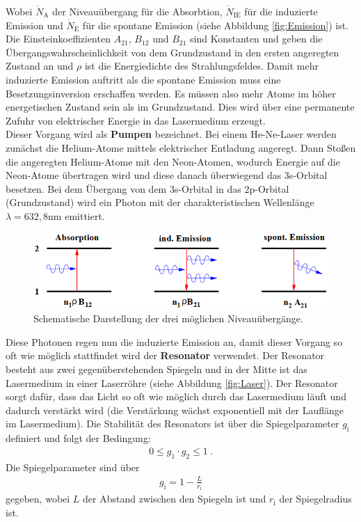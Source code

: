 Wobei $\dot{N}_\text{A}$ der Niveauübergang für die Absorbtion, $\dot{N}_\text{IE}$ für die induzierte Emission und $\dot{N}_\text{E}$ für die spontane Emission (siehe Abbildung \eqref{fig:Emission}) ist. Die Einsteinkoeffizienten $A_{21}$, $B_{12}$ und $B_{21}$ sind Konstanten und geben die Übergangswahrscheinlichkeit von dem Grundzustand in den ersten angeregten Zustand an und $\rho$ ist die Energiedichte des Strahlungsfeldes. Damit mehr induzierte Emission auftritt als die spontane Emission muss eine Besetzungsinversion erschaffen werden. Es müssen also mehr Atome im höher energetischen Zustand sein als im Grundzustand. Dies wird über eine permanente Zufuhr von elektrischer Energie in das Lasermedium erzeugt. \\
Dieser Vorgang wird als \textbf{Pumpen} bezeichnet. Bei einem He-Ne-Laser werden zunächst die Helium-Atome mittels elektrischer Entladung angeregt. Dann Stoßen die angeregten Helium-Atome mit den Neon-Atomen, wodurch Energie auf die Neon-Atome übertragen wird und diese danach überwiegend das 3s-Orbital besetzen. Bei dem Übergang von dem 3s-Orbital in das 2p-Orbital (Grundzustand) wird ein Photon mit der charakteristischen Wellenlänge $\lambda = 632,8$nm emittiert.

\begin{figure}[H]
	\includegraphics[width=\linewidth]{Bilder/Emission.PNG}
	\caption{Schematische Darstellung der drei möglichen Niveauübergänge. \cite{V61}}
	\label{fig:Emission}
\end{figure}

Diese Photonen regen nun die induzierte Emission an, damit dieser Vorgang so oft wie möglich stattfindet wird der \textbf{Resonator} verwendet. Der Resonator besteht aus zwei gegenüberstehenden Spiegeln und in der Mitte ist das Lasermedium in einer Laserröhre (siehe Abbildung \eqref{fig:Laser}). Der Resonator sorgt dafür, dass das Licht so oft wie möglich durch das Lasermedium läuft und dadurch verstärkt wird (die Verstärkung wächst exponentiell mit der Lauflänge im Lasermedium). Die Stabilität des Resonators ist über die Spiegelparameter $g_\text{i}$ definiert und folgt der Bedingung:
\begin{align}
	0 \le g_1 \cdot g_2 \le 1 \ .
	\label{eqn:Stab}
\end{align}
Die Spiegelparameter sind über
\begin{align}
	g_\text{i} = 1 - \frac{L}{r_\text{i}}
\end{align}
gegeben, wobei $L$ der Abstand zwischen den Spiegeln ist und $r_\text{i}$ der Spiegelradius ist.

